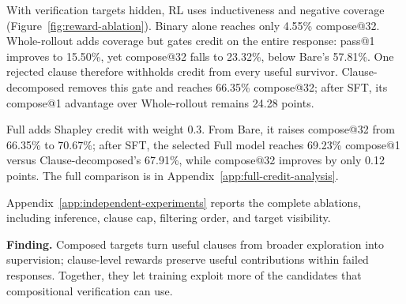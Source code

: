 With verification targets hidden, RL uses inductiveness and negative coverage
(Figure~\ref{fig:reward-ablation}).  Binary alone reaches only 4.55\%
compose@32.  Whole-rollout adds coverage but gates credit on the entire
response: pass@1 improves to 15.50\%, yet compose@32 falls to 23.32\%,
below Bare's 57.81\%.  One rejected clause therefore withholds credit from
every useful survivor.  Clause-decomposed removes this gate and reaches
66.35\% compose@32; after SFT, its compose@1 advantage over Whole-rollout
remains 24.28 points.

Full adds Shapley credit with weight 0.3.  From Bare, it raises compose@32
from 66.35\% to 70.67\%; after SFT, the selected Full model reaches
69.23\% compose@1 versus Clause-decomposed's 67.91\%, while compose@32 improves by only
0.12 points.  The full comparison is in Appendix~\ref{app:full-credit-analysis}.

\label{sec:exp:probe}
Appendix~\ref{app:independent-experiments} reports the complete ablations,
including inference, clause cap, filtering order,
and target visibility.

\begin{insightbox}
\textbf{Finding.}
Composed targets turn useful clauses from broader exploration into supervision;
clause-level rewards preserve useful contributions within failed responses.
Together, they let training exploit more of the candidates that compositional
verification can use.
\end{insightbox}
